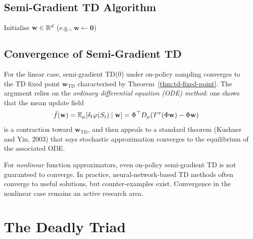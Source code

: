 \subsection{Semi-Gradient TD Algorithm}

\begin{algorithm}[ht]
\caption{Semi-Gradient TD(0) for Policy Evaluation}
\label{alg:semi-grad-td0}
\KwIn{Policy $\pi$, feature map $\varphi$, step size $\alpha > 0$, discount $\gamma \in [0,1)$}
Initialise $\mathbf{w} \in \mathbb{R}^d$ (e.g., $\mathbf{w} \leftarrow \mathbf{0}$)\;
\end{algorithm}

\subsection{Convergence of Semi-Gradient TD}

For the linear case, semi-gradient TD(0) under on-policy sampling converges to the TD fixed point
$\mathbf{w}_{\mathrm{TD}}$ characterised by Theorem~\ref{thm:td-fixed-point}.  The argument
relies on the \emph{ordinary differential equation (ODE) method}: one shows that
the mean update field
\[
\bar{f}(\mathbf{w}) = \operatorname{\mathbb{E}}_\mu[\delta_t \varphi(S_t) \mid \mathbf{w}]
= \Phi^\top D_\mu (T^\pi(\Phi\mathbf{w}) - \Phi\mathbf{w})
\]
is a contraction toward $\mathbf{w}_{\mathrm{TD}}$, and then appeals to a standard theorem
(Kushner and Yin, 2003) that says stochastic approximation converges to the equilibrium of the
associated ODE.

For \emph{nonlinear} function approximators, even on-policy semi-gradient TD is not guaranteed to
converge.  In practice, neural-network-based TD methods often converge to useful solutions, but
counter-examples exist.  Convergence in the nonlinear case remains an active research area.

\section{The Deadly Triad}
\label{sec:deadly-triad}

